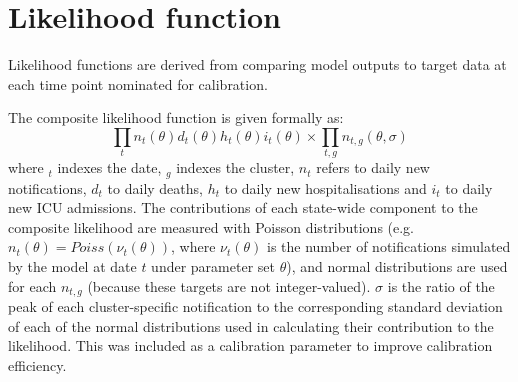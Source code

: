 \section{Likelihood function}

Likelihood functions are derived from comparing model outputs to target data at each time point nominated for calibration.

The composite likelihood function is given formally as:
\[\prod_{t}{n_{t}(\theta)d_{t}(\theta)h_{t}(\theta)i_{t}(\theta)} \times \prod_{t,g}{n_{t,g}(\theta,\sigma)}\]
where \(_{t}\) indexes the date, \(_{g}\) indexes the cluster, \(n_{t}\) refers to daily new notifications, \(d_{t}\) to daily deaths, \(h_{t}\) to daily new hospitalisations and \(i_{t}\) to daily new ICU admissions. The contributions of each state-wide component to the composite likelihood are measured with Poisson distributions (e.g. \(n_{t}(\theta)=Poiss(\nu_{t}(\theta))\), where \(\nu_{t}(\theta)\) is the number of notifications simulated by the model at date \(t\) under parameter set \(\theta\)), and normal distributions are used for each \(n_{t,g}\) (because these targets are not integer-valued). \(\sigma\) is the ratio of the peak of each cluster-specific notification to the corresponding standard deviation of each of the normal distributions used in calculating their contribution to the likelihood. This was included as a calibration parameter to improve calibration efficiency.
